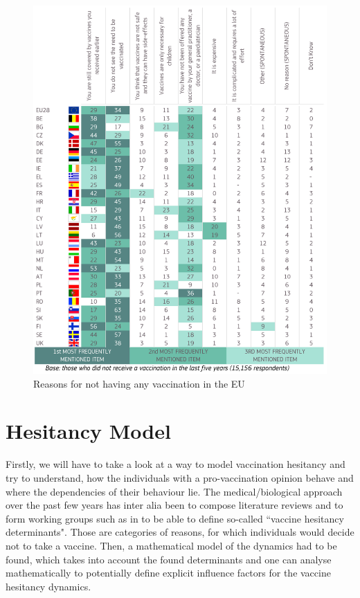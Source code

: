 \documentclass[12pt,a4paper,twoside]{article}
\begin{document}
\begin{figure}[h!]
	\centering %
	\caption{Reasons for not having any vaccination in the EU
		\label{fig:vaccine_mistrust_eu} \cite{KantarBelgium2019}}
	\includegraphics[scale=0.387]{img/vaccine_hesitancy_EU_MULTIPLE_ANSWERS.png}
\end{figure}

\newpage

\section{Hesitancy Model}
Firstly, we will have to take a look at a way to model vaccination hesitancy and try to understand, how the individuals with a pro-vaccination opinion behave and where the dependencies of their behaviour lie. The medical/biological approach over the past few years has inter alia been to compose literature reviews and to form working groups such as in \cite{MacDonald2015} to be able to define so-called ``vaccine hesitancy determinants". Those are categories of reasons, for which individuals would decide not to take a vaccine. Then, a mathematical model of the dynamics had to be found, which takes into account the found determinants and one can analyse mathematically to potentially define explicit influence factors for the vaccine hesitancy dynamics. 
\end{document}
